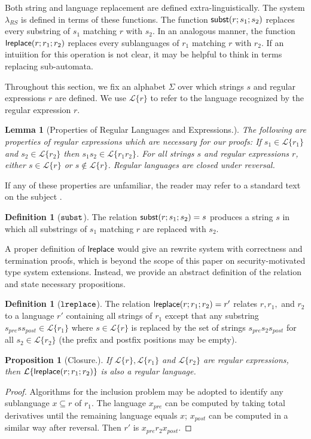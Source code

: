 \documentclass[9pt]{sig-alternate}
\newtheorem{lem}[thm]{Lemma}
\newtheorem{prop}[thm]{Proposition}
\theoremstyle{definition}
\newtheorem{defn}[thm]{Definition}
\newcommand{\Lagr}{\mathcal{L}}
\newcommand{\lang}[1]{\Lagr\{#1\}}
\newcommand{\lambdas}{\lambda_{RS}}
\newcommand{\lsubst}[3]{{\sf subst}(#1;#2;#3)} %
\newcommand{\lreplace}[3]{{\sf lreplace}(#1; #2; #3)}
\begin{document}
Both string and language replacement are defined extra-linguistically.
The system $\lambdas$ is defined in terms of these functions.
The function $\lsubst{r}{s_1}{s_2}$ replaces every substring of $s_1$ matching $r$ with $s_2$.
In an analogous manner, the function $\lreplace{r}{r_1}{r_2}$ replaces every sublanguages of $r_1$ matching $r$ with $r_2$.
If an intuiition for this operation is not clear, it may be helpful to think in terms replacing sub-automata.


Throughout this section, we fix an alphabet $\Sigma$ over which strings $s$ and
regular expressions $r$ are defined. We use $\lang{r}$ to refer to the
language recognized by the regular expression $r$. 

\begin{lem}[Properties of Regular Languages and Expressions.] \label{thm:regexprops}
The following are properties of regular expressions which are necessary for our proofs:
If $s_1 \in \lang{r_1}$ and $s_2 \in \lang{r_2}$ then $s_1s_2 \in \lang{r_1r_2}$.
For all strings $s$ and regular expressions $r$, either $s \in \lang{r}$ or $s \not \in \lang{r}$.
Regular languages are closed under reversal.
\end{lem}

If any of these properties are unfamiliar, the reader may refer to a standard text on the subject \cite{cinderella}.

\begin{defn}[$\tt{subst}$]
The relation $\lsubst{r}{s_1}{s_2} = s$ produces a string $s$ in which all substrings of $s_1$ matching $r$ are replaced with $s_2$.
\end{defn}

A proper definition of ${\sf lreplace}$ would give an rewrite system with correctness and termination proofs, which is beyond the scope of this paper
on security-motivated type system extensions. Instead, we provide an abstract definition of the relation and state necessary propositions.

\begin{defn}[$\tt{lreplace}$]
  The relation $\lreplace{r}{r_1}{r_2} = r'$ relates $r, r_1,$ and $r_2$ to
  a language $r'$ containing all strings of $r_1$ except that any substring $s_{pre} s s_{post} \in \lang{r_1}$ where $s \in \lang{r}$
  is replaced by the set of strings $s_{pre} s_2 s_{post}$ for all $s_2 \in \lang{r_2}$ (the prefix and postfix positions may be empty).
\end{defn}

\begin{prop}[Closure.] \label{thm:total}
  If $\lang{r}, \lang{r_1}$ and $\lang{r_2}$ are regular expressions, then $\lang{\lreplace{r}{r_1}{r_2}}$ is also a regular language.
\end{prop}
\begin{proof}
Algorithms for the inclusion problem may be adopted to identify any sublanguage $x \subseteq r$ of $r_1$.
The language $x_{pre}$ can be computed by taking total derivatives until the remaining language
equals $x$; $x_{post}$ can be computed in a similar way after reversal.
Then $r'$ is $x_{pre}r_2x_{post}$.
\end{proof}
\end{document}
